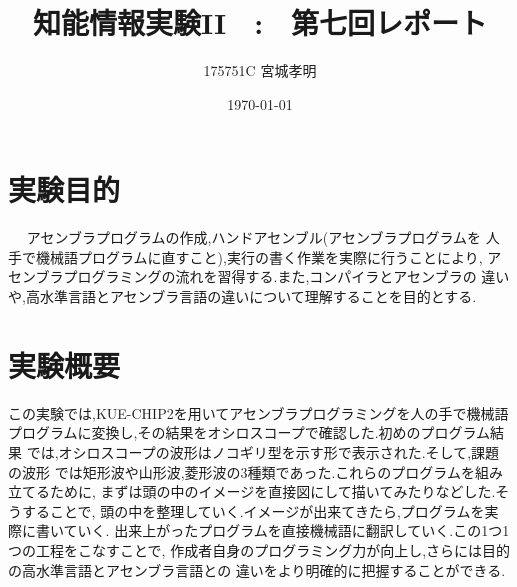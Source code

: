 \documentclass[a4paper,11pt,titlepage]{jarticle}
\title{知能情報実験II　:　第七回レポート}
\author{175751C 宮城孝明}
\date{\today}
\begin{document}
\maketitle
\tableofcontents
\clearpage
\section{実験目的}
　 アセンブラプログラムの作成,ハンドアセンブル(アセンブラプログラムを
人手で機械語プログラムに直すこと),実行の書く作業を実際に行うことにより,
アセンブラプログラミングの流れを習得する.また,コンパイラとアセンブラの
違いや,高水準言語とアセンブラ言語の違いについて理解することを目的とする.

\section{実験概要}
  この実験では,KUE-CHIP2を用いてアセンブラプログラミングを人の手で機械語
プログラムに変換し,その結果をオシロスコープで確認した.初めのプログラム結果
では,オシロスコープの波形はノコギリ型を示す形で表示された.そして,課題の波形
では矩形波や山形波,菱形波の3種類であった.これらのプログラムを組み立てるために,
まずは頭の中のイメージを直接図にして描いてみたりなどした.そうすることで,
頭の中を整理していく.イメージが出来てきたら,プログラムを実際に書いていく.
出来上がったプログラムを直接機械語に翻訳していく.この1つ1つの工程をこなすことで,
作成者自身のプログラミング力が向上し,さらには目的の高水準言語とアセンブラ言語との
違いをより明確的に把握することができる.
\end{document}
